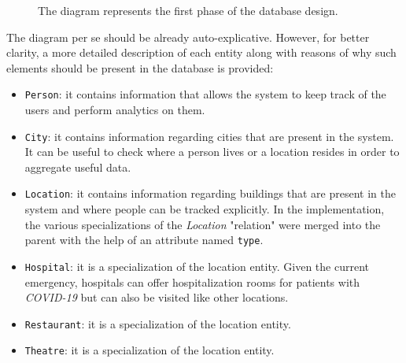 \documentclass[12pt, a4paper]{article}
\begin{document}
\begin{figure}[h]
    \caption*{The diagram represents the first phase of the database design.} %
\end{figure}

\noindent %
The diagram per se should be already auto-explicative. However, for better 
clarity, a more detailed description of each entity along with reasons of why 
such elements should be present in the database is provided:

\begin{itemize}
    \item \texttt{Person}: it contains information that allows the system to
        keep track of the users and perform analytics on them.  
    \item \texttt{City}: it contains information regarding cities that are
        present in the system. It can be useful to check where a person lives
        or a location resides in order to aggregate useful data.
    \item \texttt{Location}: it contains information regarding buildings that 
        are present in the system and where people can be tracked explicitly. 
        In the implementation, the various specializations of the 
        \emph{Location} "relation" were merged into the parent with the help
        of an attribute named \texttt{type}.
    \item \texttt{Hospital}: it is a specialization of the location entity. 
        Given the current emergency, hospitals can offer hospitalization rooms 
        for patients with \emph{COVID-19} but can also be visited like other 
        locations. 
    \item \texttt{Restaurant}: it is a specialization of the location entity. 
    \item \texttt{Theatre}: it is a specialization of the location entity.  
\end{itemize}
\end{document}
